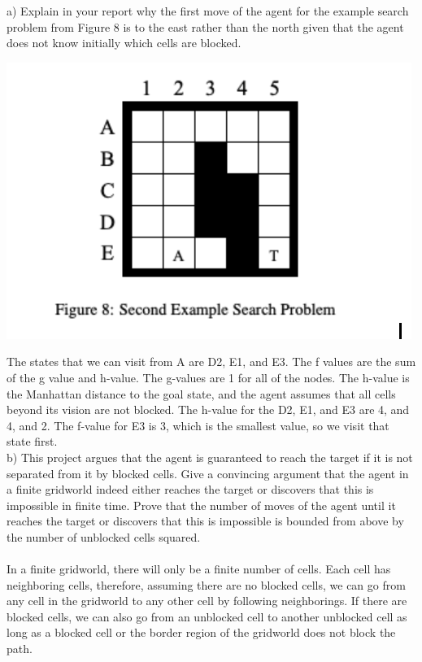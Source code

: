 \documentclass[a4paper]{article}
\theoremstyle{definition}
\theoremstyle{plain}
\begin{document}
a) Explain in your report why the first move of the agent for the example search problem from Figure 8 is to the east rather than the north given that the agent does not know initially which cells are blocked.
\begin{center}
\includegraphics{part1 problem.PNG}
\end{center}
The states that we can visit from A are D2, E1, and E3. The f values are the sum of the g value and h-value. The g-values are 1 for all of the nodes. The h-value is the Manhattan distance to the goal state, and the agent assumes that all cells beyond its vision are not blocked. The h-value for the D2, E1, and E3 are 4, and 4, and 2. The f-value for E3 is 3, which is the smallest value, so we visit that state first.\\ b) This project argues that the agent is guaranteed to reach the target if it is not separated from it by blocked cells. Give a convincing argument that the agent in a finite gridworld indeed either reaches the target or discovers that this is impossible in finite time. Prove that the number of moves of the agent until it reaches the target or discovers that this is impossible is bounded from above by the number of unblocked cells squared. 
\\ \\ 
In a finite gridworld, there will only be a finite number of cells. Each cell has neighboring cells, therefore, assuming there are no blocked cells, we can go from any cell in the gridworld to any other cell by following neighborings. If there are blocked cells, we can also go from an unblocked cell to another unblocked cell as long as a blocked cell or the border region of the gridworld does not block the path. \\
\end{document}
